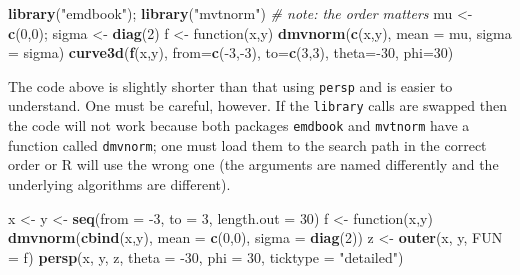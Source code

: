 \documentclass[]{book}
\newenvironment{Shaded}{\begin{snugshade}}{\end{snugshade}}
\newcommand{\KeywordTok}[1]{\textcolor[rgb]{0.13,0.29,0.53}{\textbf{{#1}}}}
\newcommand{\DataTypeTok}[1]{\textcolor[rgb]{0.13,0.29,0.53}{{#1}}}
\newcommand{\DecValTok}[1]{\textcolor[rgb]{0.00,0.00,0.81}{{#1}}}
\newcommand{\StringTok}[1]{\textcolor[rgb]{0.31,0.60,0.02}{{#1}}}
\newcommand{\CommentTok}[1]{\textcolor[rgb]{0.56,0.35,0.01}{\textit{{#1}}}}
\newcommand{\NormalTok}[1]{{#1}}
\numberwithin{equation}{chapter}
\numberwithin{figure}{chapter}
\theoremstyle{plain}
\theoremstyle{definition}
\theoremstyle{remark}
\theoremstyle{definition}
\theoremstyle{definition}
\theoremstyle{remark}
\begin{document}
\begin{Shaded}
\begin{Highlighting}[]
\KeywordTok{library}\NormalTok{(}\StringTok{"emdbook"}\NormalTok{); }\KeywordTok{library}\NormalTok{(}\StringTok{"mvtnorm"}\NormalTok{) }\CommentTok{# note: the order matters}
\NormalTok{mu <-}\StringTok{ }\KeywordTok{c}\NormalTok{(}\DecValTok{0}\NormalTok{,}\DecValTok{0}\NormalTok{); sigma <-}\StringTok{ }\KeywordTok{diag}\NormalTok{(}\DecValTok{2}\NormalTok{)}
\NormalTok{f <-}\StringTok{ }\NormalTok{function(x,y) }\KeywordTok{dmvnorm}\NormalTok{(}\KeywordTok{c}\NormalTok{(x,y), }\DataTypeTok{mean =} \NormalTok{mu, }\DataTypeTok{sigma =} \NormalTok{sigma)}
\KeywordTok{curve3d}\NormalTok{(}\KeywordTok{f}\NormalTok{(x,y), }\DataTypeTok{from=}\KeywordTok{c}\NormalTok{(-}\DecValTok{3}\NormalTok{,-}\DecValTok{3}\NormalTok{), }\DataTypeTok{to=}\KeywordTok{c}\NormalTok{(}\DecValTok{3}\NormalTok{,}\DecValTok{3}\NormalTok{), }\DataTypeTok{theta=}\NormalTok{-}\DecValTok{30}\NormalTok{, }\DataTypeTok{phi=}\DecValTok{30}\NormalTok{)}
\end{Highlighting}
\end{Shaded}

The code above is slightly shorter than that using \texttt{persp} and is
easier to understand. One must be careful, however. If the
\texttt{library} calls are swapped then the code will not work because
both packages \texttt{emdbook} and \texttt{mvtnorm} have a function
called \texttt{dmvnorm}; one must load them to the search path in the
correct order or R will use the wrong one (the arguments are named
differently and the underlying algorithms are different).

\begin{Shaded}
\begin{Highlighting}[]
\NormalTok{x <-}\StringTok{ }\NormalTok{y <-}\StringTok{ }\KeywordTok{seq}\NormalTok{(}\DataTypeTok{from =} \NormalTok{-}\DecValTok{3}\NormalTok{, }\DataTypeTok{to =} \DecValTok{3}\NormalTok{, }\DataTypeTok{length.out =} \DecValTok{30}\NormalTok{)}
\NormalTok{f <-}\StringTok{ }\NormalTok{function(x,y) }\KeywordTok{dmvnorm}\NormalTok{(}\KeywordTok{cbind}\NormalTok{(x,y), }\DataTypeTok{mean =} \KeywordTok{c}\NormalTok{(}\DecValTok{0}\NormalTok{,}\DecValTok{0}\NormalTok{), }\DataTypeTok{sigma =} \KeywordTok{diag}\NormalTok{(}\DecValTok{2}\NormalTok{))}
\NormalTok{z <-}\StringTok{ }\KeywordTok{outer}\NormalTok{(x, y, }\DataTypeTok{FUN =} \NormalTok{f)}
\KeywordTok{persp}\NormalTok{(x, y, z, }\DataTypeTok{theta =} \NormalTok{-}\DecValTok{30}\NormalTok{, }\DataTypeTok{phi =} \DecValTok{30}\NormalTok{, }\DataTypeTok{ticktype =} \StringTok{"detailed"}\NormalTok{)}
\end{Highlighting}
\end{Shaded}
\end{document}
